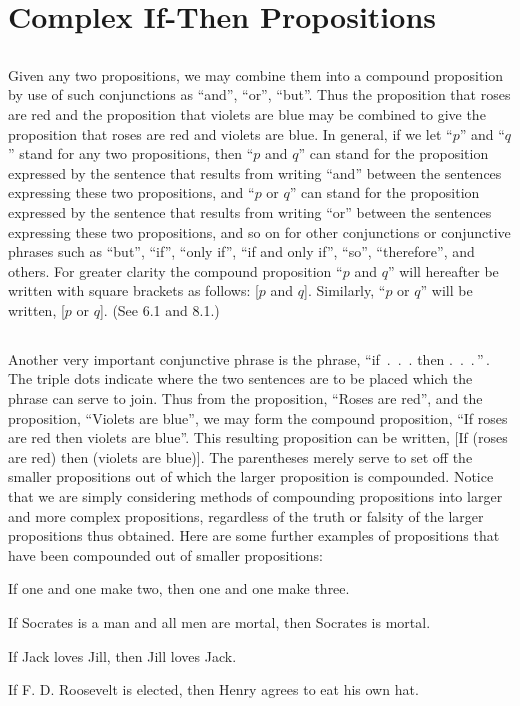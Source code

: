 \documentclass{book}
\begin{document}
\section{Complex If-Then Propositions}
\label{sec:3}

\subsection{}
\label{sec:3.1}

Given any two propositions, we may combine them into a compound proposition by use of such conjunctions as “and”, “or”, “but”.  Thus the proposition that roses are red and the proposition that violets are blue may be combined to give the proposition that roses are red and violets are blue.  In general, if we let “\(p\)” and “\(q\)” stand for any two propositions, then “\(p\) and \(q\)” can stand for the proposition expressed by the sentence that results from writing “and” between the sentences expressing these two propositions, and “\(p\) or \(q\)” can stand for the proposition expressed by the sentence that results from writing “or” between the sentences expressing these two propositions, and so on for other conjunctions or conjunctive phrases such as “but”, “if”, “only if”, “if and only if”, “so”, “therefore”, and others.  For greater clarity the compound proposition “\(p\) and \(q\)” will hereafter be written with square brackets as follows: [\(p\) and \(q\)].  Similarly, “\(p\) or \(q\)” will be written, [\(p\) or \(q\)].  (See 6.1 and 8.1.)

\subsection{}
\label{sec:3.2}

Another very important conjunctive phrase is the phrase, “if~.~.~. then .~.~.\,”\,.  The triple dots indicate where the two sentences are to be placed which the phrase can serve to join.  Thus from the proposition, “Roses are red”, and the proposition, “Violets are blue”, we may form the compound proposition, “If roses are red then violets are blue”.  This resulting proposition can be written, [If (roses are red) then (violets are blue)].  The parentheses merely serve to set off the smaller propositions out of which the larger proposition is compounded.  Notice that we are simply considering methods of compounding propositions into larger and more complex propositions, regardless of the truth or falsity of the larger propositions thus obtained.  Here are some further examples of propositions that have been compounded out of smaller propositions:
\begin{description}[left=2\parindent,itemindent=-2ex,labelsep=0pt, nosep,topsep=3pt]
\item If one and one make two, then one and one make three.
\item If Socrates is a man and all men are mortal, then Socrates is mortal.
\item If Jack loves Jill, then Jill loves Jack.
\item If F. D. Roosevelt is elected, then Henry agrees to eat his own hat.
\end{description}
\end{document}
